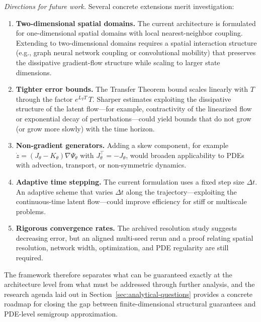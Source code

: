 \documentclass[hidelinks,review,nohypdvips,onefignum,onetabnum]{siamart220329}
\newcounter{problem}[section]
\begin{document}
\emph{Directions for future work.}
Several concrete extensions merit investigation:
\begin{enumerate}[label=(\arabic*)]
    \item \textbf{Two-dimensional spatial domains.} The current architecture is formulated for one-dimensional spatial domains with local nearest-neighbor coupling. Extending to two-dimensional domains requires a spatial interaction structure (e.g., graph neural network coupling or convolutional mobility) that preserves the dissipative gradient-flow structure while scaling to larger state dimensions.
    \item \textbf{Tighter error bounds.} The Transfer Theorem bound scales linearly with $T$ through the factor $e^{L_TT}\,T$. Sharper estimates exploiting the dissipative structure of the latent flow---for example, contractivity of the linearized flow or exponential decay of perturbations---could yield bounds that do not grow (or grow more slowly) with the time horizon.
    \item \textbf{Non-gradient generators.} Adding a skew component, for example $\dot z=(J_\theta-K_\theta)\nabla\Psi_\theta$ with $J_\theta^\top=-J_\theta$, would broaden applicability to PDEs with advection, transport, or non-symmetric dynamics.
    \item \textbf{Adaptive time stepping.} The current formulation uses a fixed step size $\Delta t$. An adaptive scheme that varies $\Delta t$ along the trajectory---exploiting the continuous-time latent flow---could improve efficiency for stiff or multiscale problems.
    \item \textbf{Rigorous convergence rates.} The archived resolution study suggests decreasing error, but an aligned multi-seed rerun and a proof relating spatial resolution, network width, optimization, and PDE regularity are still required.
\end{enumerate}

The framework therefore separates what can be guaranteed exactly at the architecture level from what must be addressed through further analysis, and the research agenda laid out in Section~\ref{sec:analytical-questions} provides a concrete roadmap for closing the gap between finite-dimensional structural guarantees and PDE-level semigroup approximation.
\end{document}
